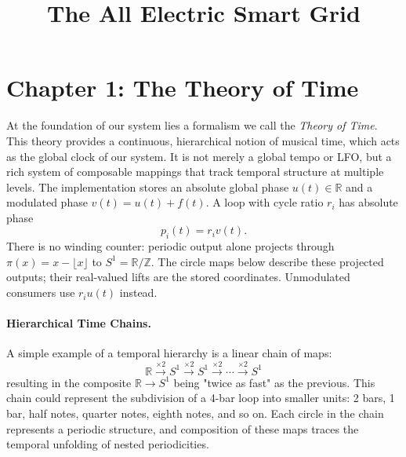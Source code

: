 \documentclass[12pt]{article}
\title{The All Electric Smart Grid}
\author{}
\date{}
\begin{document}
\maketitle

\section*{Chapter 1: The Theory of Time}

At the foundation of our system lies a formalism we call the \emph{Theory of Time}.  
This theory provides a continuous, hierarchical notion of musical time, which acts as the global clock of our system.
It is not merely a global tempo or LFO, but a rich system of composable mappings that track temporal structure at multiple levels.  
The implementation stores an absolute global phase $u(t)\in\mathbb{R}$ and a modulated phase $v(t)=u(t)+f(t)$. A loop with cycle ratio $r_i$ has absolute phase
\[
p_i(t)=r_i v(t).
\]
There is no winding counter: periodic output alone projects through $\pi(x)=x-\lfloor x\rfloor$ to $S^1=\mathbb{R}/\mathbb{Z}$. The circle maps below describe these projected outputs; their real-valued lifts are the stored coordinates. Unmodulated consumers use $r_i u(t)$ instead.

\paragraph{Hierarchical Time Chains.}  
A simple example of a temporal hierarchy is a linear chain of maps:
\[
\mathbb{R} \xrightarrow{\times 2} S^1 \xrightarrow{\times 2} S^1 \xrightarrow{\times 2} \cdots \xrightarrow{\times 2} S^1
\]
resulting in the composite $\mathbb{R} \to S^1$ being "twice as fast" as the previous.  
This chain could represent the subdivision of a 4-bar loop into smaller units: 2 bars, 1 bar, half notes, quarter notes, eighth notes, and so on.  
Each circle in the chain represents a periodic structure, and composition of these maps traces the temporal unfolding of nested periodicities.
\end{document}

